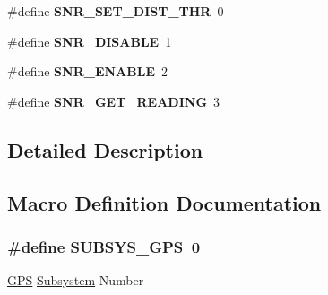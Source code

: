 \begin{DoxyCompactItemize}
\item 
\hypertarget{group__system__consts_gaa5d2a4af7281457c965323f4c26ea9ab}{\#define {\bfseries S\-N\-R\-\_\-\-S\-E\-T\-\_\-\-D\-I\-S\-T\-\_\-\-T\-H\-R}~0}\label{group__system__consts_gaa5d2a4af7281457c965323f4c26ea9ab}

\item 
\hypertarget{group__system__consts_ga9b110968cd5bd961f4984c02965cf9ba}{\#define {\bfseries S\-N\-R\-\_\-\-D\-I\-S\-A\-B\-L\-E}~1}\label{group__system__consts_ga9b110968cd5bd961f4984c02965cf9ba}

\item 
\hypertarget{group__system__consts_ga994c94413393c44561f42e781da5815f}{\#define {\bfseries S\-N\-R\-\_\-\-E\-N\-A\-B\-L\-E}~2}\label{group__system__consts_ga994c94413393c44561f42e781da5815f}

\item 
\hypertarget{group__system__consts_ga6b4b3d5c4969ca317548a1d9c8686c4f}{\#define {\bfseries S\-N\-R\-\_\-\-G\-E\-T\-\_\-\-R\-E\-A\-D\-I\-N\-G}~3}\label{group__system__consts_ga6b4b3d5c4969ca317548a1d9c8686c4f}

\end{DoxyCompactItemize}


\subsection{Detailed Description}


\subsection{Macro Definition Documentation}
\hypertarget{group__system__consts_ga468920c27e6f462f4319229cda832476}{
\subsubsection[{S\-U\-B\-S\-Y\-S\-\_\-\-G\-P\-S}]{\setlength{\rightskip}{0pt plus 5cm}\#define S\-U\-B\-S\-Y\-S\-\_\-\-G\-P\-S~0}}\label{group__system__consts_ga468920c27e6f462f4319229cda832476}
\hyperlink{classGPS}{G\-P\-S} \hyperlink{classSubsystem}{Subsystem} Number 
